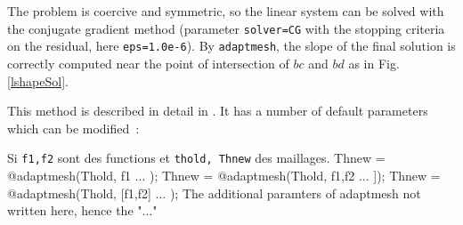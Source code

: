 \documentclass[a4paper,twoside,12pt]{book}
\begin{document}
The problem is coercive and symmetric,
so the linear system can be solved with the conjugate gradient
method  (parameter \texttt{solver=CG}
with the stopping criteria on the residual, here
\texttt{eps=1.0e-6}).
By \texttt{adaptmesh}, the slope of the final solution is correctly computed near
the point of intersection of $bc$ and $bd$ as in Fig. \ref{lshapeSol}.

This method is described in detail in \cite{bamg}. It has a number of
default parameters which can be modified~:


Si \texttt{f1,f2} sont des functions  et \texttt{thold, Thnew} des maillages.
\bFF
    Thnew = @adaptmesh(Thold, f1  ...  );
    Thnew = @adaptmesh(Thold, f1,f2  ...  ]);
    Thnew = @adaptmesh(Thold, [f1,f2]  ...  );
\eFF
The additional paramters of  adaptmesh not written here, hence the  "..."
\end{document}
